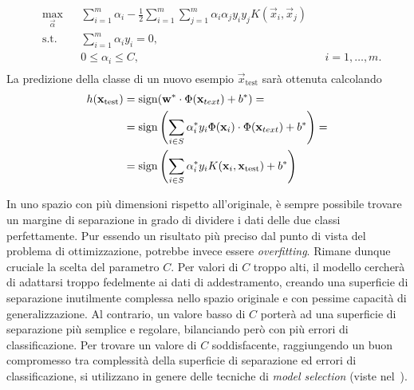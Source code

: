 \begin{equation}\label{eq:svc:softmargin:wolfe_dual_plus_kernel_trick}
\begin{aligned}
& \max_{\vec{\alpha}}    && \sum_{i=1}^{m}\alpha_i - \frac{1}{2}\sum_{i=1}^{m}\sum_{j=1}^{m}\alpha_i\alpha_jy_iy_jK(\Vec{x}_i, \Vec{x}_j)\\
& \textrm{s.t.} && \sum_{i=1}^{m} \alpha_iy_i = 0, \\
&               && 0 \leq \alpha_i \leq C, && i=1,\dots,m. \\
\end{aligned}
\end{equation}
%
La predizione della classe di un nuovo esempio $\Vec{x}_\text{test}$ sarà ottenuta calcolando 
\begin{align*}
h(\Vec{x}_\text{test})  &= \sign(\Vec{w}^*\cdot\Phi(\vec{x}_{text}) +b^*) =\\
                        &= \sign\left(\sum_{i\in S} \alpha_i^*y_i \Phi(\vec{x}_i) \cdot \Phi(\vec{x}_{text}) + b^*\right)=\\
                        &= \sign\left(\sum_{i \in S}\alpha_i^*y_iK(\Vec{x}_i, \Vec{x}_\text{test}) + b^*\right)
\end{align*}

In uno spazio con più dimensioni rispetto all'originale, è sempre possibile trovare un margine di separazione in grado di dividere i dati delle due classi perfettamente. %
Pur essendo un risultato più preciso dal punto di vista del problema di ottimizzazione, potrebbe invece essere \emph{overfitting}. Rimane dunque cruciale la scelta del parametro $C$. 
Per valori di $C$ troppo alti, il modello cercherà di adattarsi troppo fedelmente ai dati di addestramento, creando una superficie di separazione inutilmente complessa nello spazio originale e con pessime capacità di generalizzazione. 
Al contrario, un valore basso di $C$ porterà ad una superficie di separazione più semplice e regolare, bilanciando però con più errori di classificazione. 
Per trovare un valore di $C$ soddisfacente, raggiungendo un buon compromesso tra complessità della superficie di separazione ed errori di classificazione, si utilizzano in genere delle tecniche di \emph{model selection} (viste nel~).  


